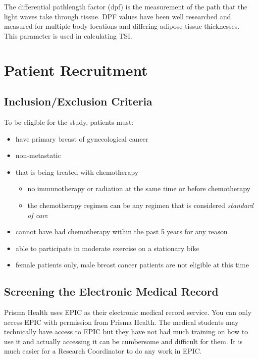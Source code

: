 \documentclass[
]{book}
\providecommand{\tightlist}{%
  \setlength{\itemsep}{0pt}\setlength{\parskip}{0pt}}
\begin{document}
The differential pathlength factor (dpf) is the measurement of the path that the light waves take through tissue. DPF values have been well researched and measured for multiple body locations and differing adipose tissue thicknesses. This parameter is used in calculating TSI.

\hypertarget{PatientRecruitment}{%
\chapter{Patient Recruitment}\label{PatientRecruitment}}

\hypertarget{inclusionexclusion-criteria}{%
\section{Inclusion/Exclusion Criteria}\label{inclusionexclusion-criteria}}

To be eligible for the study, patients must:

\begin{itemize}
\tightlist
\item
  have primary breast of gynecological cancer
\item
  non-metastatic
\item
  that is being treated with chemotherapy

  \begin{itemize}
  \tightlist
  \item
    no immunotherapy or radiation at the same time or before chemotherapy
  \item
    the chemotherapy regimen can be any regimen that is considered \emph{standard of care}
  \end{itemize}
\item
  cannot have had chemotherapy within the past 5 years for any reason
\item
  able to participate in moderate exercise on a stationary bike
\item
  female patients only, male breast cancer patients are not eligible at this time
\end{itemize}

\hypertarget{screening-the-electronic-medical-record}{%
\section{Screening the Electronic Medical Record}\label{screening-the-electronic-medical-record}}

Prisma Health uses EPIC as their electronic medical record service.
You can only access EPIC with permission from Prisma Health. The medical students may technically have access to EPIC but they have not had much training on how to use it and actually accessing it can be cumbersome and difficult for them. It is much easier for a Research Coordinator to do any work in EPIC.
\end{document}
